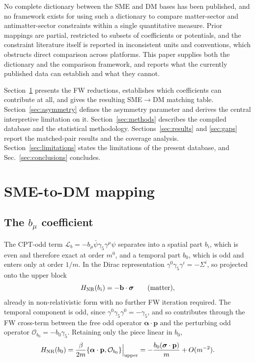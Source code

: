 \documentclass[
  aps,
  prd,
  reprint,
  amsmath,
  amssymb,
  nofootinbib,
  superscriptaddress,
  floatfix
]{revtex4-2}
\newcommand{\sig}{\bm{\sigma}}
\begin{document}
No complete dictionary between the SME and DM bases has been published,
and no framework exists for using such a dictionary to compare
matter-sector and antimatter-sector constraints within a single
quantitative measure. Prior mappings are partial, restricted to subsets of
coefficients or potentials, and the constraint literature itself is
reported in inconsistent units and conventions, which obstructs direct
comparison across platforms. This paper supplies both the dictionary and
the comparison framework, and reports what the currently published data
can establish and what they cannot.

Section~\ref{sec:mapping} presents the FW reductions, establishes which
coefficients can contribute at all, and gives the resulting SME$\to$DM
matching table. Section~\ref{sec:asymmetry} defines the
asymmetry parameter and derives the central interpretive limitation on it.
Section~\ref{sec:methods} describes the compiled database and the
statistical methodology. Sections~\ref{sec:results} and \ref{sec:gaps}
report the matched-pair results and the coverage analysis.
Section~\ref{sec:limitations} states the limitations of the present
database, and Sec.~\ref{sec:conclusions} concludes.

\section{SME-to-DM mapping}
\label{sec:mapping}

\subsection{The \texorpdfstring{$b_\mu$}{b-mu} coefficient}
\label{sec:bmu}

The CPT-odd term $\mathcal{L}_b=-b_\mu\bar\psi\gamma_5\gamma^\mu\psi$
separates into a spatial part $b_i$, which is even and therefore exact at
order $m^0$, and a temporal part $b_0$, which is odd and enters only at
order $1/m$. In the Dirac representation
$\gamma^0\gamma_5\gamma^i=-\Sigma^i$, so projected onto the upper block
\begin{equation}
  H_{\rm NR}(b_i) = -\mathbf{b}\cdot\sig \qquad (\text{matter}),
  \label{eq:bi-matter}
\end{equation}
already in non-relativistic form with no further FW iteration required.
The temporal component is odd, since
$\gamma^0\gamma_5\gamma^0=-\gamma_5$, and so contributes through the FW
cross-term between the free odd operator $\bm{\alpha}\cdot\mathbf{p}$ and
the perturbing odd operator $\mathcal{O}_{b_0}=-b_0\gamma_5$. Retaining
only the piece linear in $b_0$,
\begin{equation}
  H_{\rm NR}(b_0)
  = \frac{\beta}{2m}\{\bm{\alpha}\cdot\mathbf{p},\mathcal{O}_{b_0}\}
    \Big|_{\rm upper}
  = -\frac{b_0(\sig\cdot\mathbf{p})}{m} + O(m^{-2}).
\end{equation}
\end{document}
